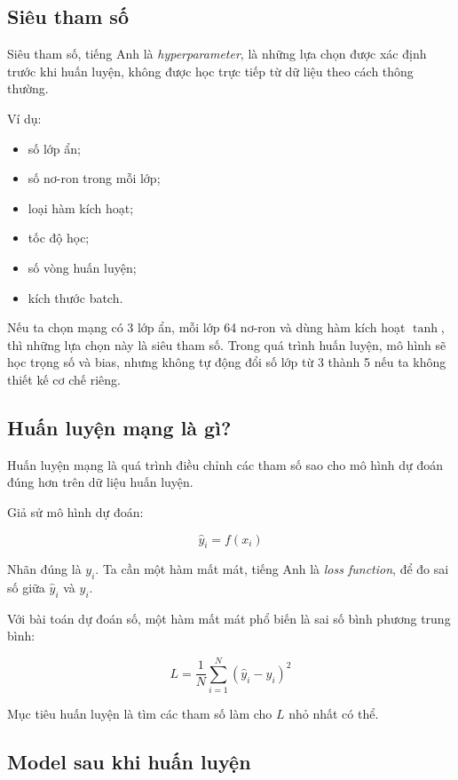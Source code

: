 \subsection{Siêu tham số}

Siêu tham số, tiếng Anh là \textit{hyperparameter}, là những lựa chọn được xác định trước khi huấn luyện, không được học trực tiếp từ dữ liệu theo cách thông thường.

Ví dụ:

\begin{itemize}
    \item số lớp ẩn;
    \item số nơ-ron trong mỗi lớp;
    \item loại hàm kích hoạt;
    \item tốc độ học;
    \item số vòng huấn luyện;
    \item kích thước batch.
\end{itemize}

\begin{vidu}
Nếu ta chọn mạng có 3 lớp ẩn, mỗi lớp 64 nơ-ron và dùng hàm kích hoạt $\tanh$, thì những lựa chọn này là siêu tham số. Trong quá trình huấn luyện, mô hình sẽ học trọng số và bias, nhưng không tự động đổi số lớp từ 3 thành 5 nếu ta không thiết kế cơ chế riêng.
\end{vidu}

\subsection{Huấn luyện mạng là gì?}

Huấn luyện mạng là quá trình điều chỉnh các tham số sao cho mô hình dự đoán đúng hơn trên dữ liệu huấn luyện.

Giả sử mô hình dự đoán:

\[
    \hat{y}_i = f(x_i)
\]

Nhãn đúng là $y_i$. Ta cần một hàm mất mát, tiếng Anh là \textit{loss function}, để đo sai số giữa $\hat{y}_i$ và $y_i$.

Với bài toán dự đoán số, một hàm mất mát phổ biến là sai số bình phương trung bình:

\[
    L = \frac{1}{N}\sum_{i=1}^{N}(\hat{y}_i-y_i)^2
\]

Mục tiêu huấn luyện là tìm các tham số làm cho $L$ nhỏ nhất có thể.

\subsection{Model sau khi huấn luyện}

